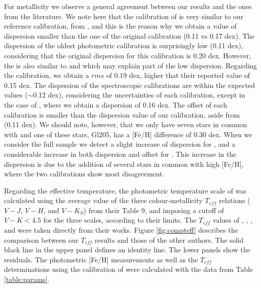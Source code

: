 \documentclass[referee]{aa}
\begin{document}
For metallicity we observe a general agreement between our results and the ones from the literature. We note here that the calibration of \citet{Schlaufman-2010} is very similar to our reference calibration, from \citet{Neves-2012}, and this is the reason why we obtain a value of dispersion smaller than the one of the original calibration (0.11 vs 0.17 dex). The dispersion of the oldest photometric calibration \citep{Bonfils-2005} is surprisingly low (0.11 dex), considering that the original dispersion for this calibration is 0.20 dex. However, the \citet{Bonfils-2005} is also similar to \citet{Schlaufman-2010} and \citet{Neves-2012} which may explain part of the low dispersion. Regarding the \citet{Johnson-2012} calibration, we obtain a $rms$ of 0.19 dex, higher that their reported value of 0.15 dex. The dispersion of the spectroscopic calibrations are within the expected values ($\sim$0.12 dex), considering the uncertainties of each calibration, except in the case of \citet{Mann-2013b}, where we obtain a dispersion of 0.16 dex. The offset of each calibration is smaller than the dispersion value of our calibration, aside from \citet{Mann-2013b} (0.11 dex). We should note, however, that we only have seven stars in common with \citet{Mann-2013b} and one of these stars, Gl205, has a [Fe/H] difference of 0.30 dex. When we consider the full sample we detect a slight increase of dispersion for \citet{Rojas-Ayala-2012}, and a considerable increase in both dispersion and offset for \citet{Newton-2013}. This increase in the \citet{Newton-2013} dispersion is due to the addition of several stars in common with high [Fe/H], where the two calibrations show most disagreement.  %

Regarding the effective temperature, the photometric temperature scale of \citet{Boyajian-2012} was calculated using the average value of the three colour-metallicity $T_{eff}$ relations ($V-J$, $V-H$, and $V-K_{S}$) from their Table 9, and imposing a cutoff of $V-K < 4.5$ for the three scales, according to their limits.  %
The $T_{eff}$ values of \citet{Rojas-Ayala-2012}, \citet{Onehag-2012}, \citet{Mann-2013a}, and \citet{Rajpurohit-2013a} were taken directly from their works. Figure \ref{fig:compteff} describes the comparison between our $T_{eff}$ results and those of the other authors. The solid black line in the upper panel defines an identity line. The lower panels show the residuals. %
The photometric [Fe/H] measurements as well as the $T_{eff}$ determinations using the calibration of \citet{Boyajian-2012} were calculated with the data from Table \ref{table:params}. 
\end{document}
